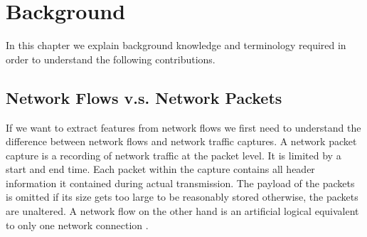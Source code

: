 \documentclass[
	ngerman,
	ruledheaders=section,%
	class=report,%
	thesis={type=bachelor},%
	accentcolor=9c,%
	custommargins=true,%
	marginpar=false,%
	parskip=half-,%
	fontsize=11pt,%
	twoside
]{tudapub}
\begin{document}
\chapter{Background}
\label{sec:background}

In this chapter we explain background knowledge and terminology required in order to understand the following contributions.


%
%

\section{Network Flows v.s. Network Packets}
\label{sec:flowvspackets}

If we want to extract features from network flows
we first need to understand the difference between network flows and network traffic captures.
A network packet capture is a recording of network traffic at the packet level.
It is limited by a start and end time.
Each packet within the capture contains all header information it contained during actual transmission.
The payload of the packets is omitted if its size gets too large to be reasonably stored otherwise, the packets are unaltered.
A network flow on the other hand is an artificial logical equivalent to only one network connection \cite{brownleeTrafficFlowMeasurement}.
\end{document}
